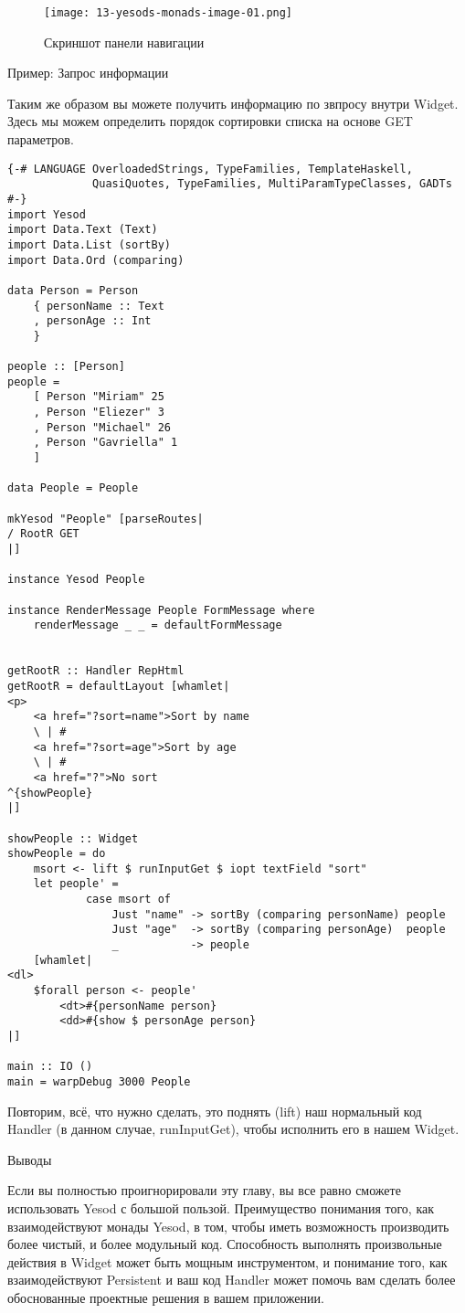 \begin{figure}[tbh]
  \centering
  \caption{Скриншот панели навигации}
  \texttt{[image: 13-yesods-monads-image-01.png]}
\end{figure}

Пример: Запрос информации

Таким же образом вы можете получить информацию по звпросу внутри Widget. Здесь мы можем определить порядок сортировки списка на основе GET параметров.

\begin{lstlisting}
{-# LANGUAGE OverloadedStrings, TypeFamilies, TemplateHaskell,
             QuasiQuotes, TypeFamilies, MultiParamTypeClasses, GADTs #-}
import Yesod
import Data.Text (Text)
import Data.List (sortBy)
import Data.Ord (comparing)

data Person = Person
    { personName :: Text
    , personAge :: Int
    }

people :: [Person]
people =
    [ Person "Miriam" 25
    , Person "Eliezer" 3
    , Person "Michael" 26
    , Person "Gavriella" 1
    ]

data People = People

mkYesod "People" [parseRoutes|
/ RootR GET
|]

instance Yesod People

instance RenderMessage People FormMessage where
    renderMessage _ _ = defaultFormMessage


getRootR :: Handler RepHtml
getRootR = defaultLayout [whamlet|
<p>
    <a href="?sort=name">Sort by name
    \ | #
    <a href="?sort=age">Sort by age
    \ | #
    <a href="?">No sort
^{showPeople}
|]

showPeople :: Widget
showPeople = do
    msort <- lift $ runInputGet $ iopt textField "sort"
    let people' =
            case msort of
                Just "name" -> sortBy (comparing personName) people
                Just "age"  -> sortBy (comparing personAge)  people
                _           -> people
    [whamlet|
<dl>
    $forall person <- people'
        <dt>#{personName person}
        <dd>#{show $ personAge person}
|]

main :: IO ()
main = warpDebug 3000 People
\end{lstlisting}

Повторим, всё, что нужно сделать, это поднять (lift) наш нормальный код Handler (в данном случае, runInputGet), чтобы исполнить его в нашем Widget.

Выводы

Если вы полностью проигнорировали эту главу, вы все равно сможете использовать Yesod с большой пользой. Преимущество понимания того, как взаимодействуют монады Yesod, в том, чтобы иметь возможность производить более чистый, и более модульный код. Способность выполнять произвольные действия в Widget может быть мощным инструментом, и понимание того, как взаимодействуют Persistent и ваш код Handler может помочь вам сделать более обоснованные проектные решения в вашем приложении.

